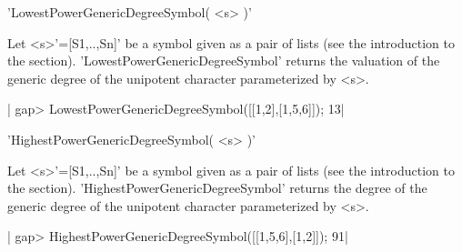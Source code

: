 %
%

'LowestPowerGenericDegreeSymbol( <s> )'

Let  <s>'=[S1,..,Sn]' be  a symbol  given as  a pair  of lists  (see the
introduction to  the section).  'LowestPowerGenericDegreeSymbol' returns
the  valuation  of  the  generic   degree  of  the  unipotent  character
parameterized by <s>.

|    gap> LowestPowerGenericDegreeSymbol([[1,2],[1,5,6]]);
    13|

%
%

'HighestPowerGenericDegreeSymbol( <s> )'

Let  <s>'=[S1,..,Sn]'  be  a  symbol  given as  a  pair  of  lists  (see
the  introduction  to  the  section).  'HighestPowerGenericDegreeSymbol'
returns  the degree  of the  generic degree  of the  unipotent character
parameterized by <s>.

|    gap> HighestPowerGenericDegreeSymbol([[1,5,6],[1,2]]);
    91|


